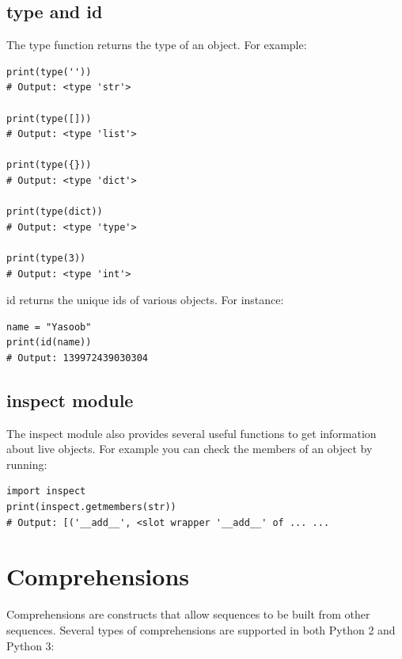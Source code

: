 \documentclass{report}
\begin{document}
    \subsection{type and id}
    \bigbreak \noindent
    The type function returns the type of an object. For example:
    \begin{verbatim}
print(type(''))
# Output: <type 'str'>

print(type([]))
# Output: <type 'list'>

print(type({}))
# Output: <type 'dict'>

print(type(dict))
# Output: <type 'type'>

print(type(3))
# Output: <type 'int'>
    \end{verbatim}
    id returns the unique ids of various objects. For instance:
    \begin{verbatim}
name = "Yasoob"
print(id(name))
# Output: 139972439030304
    \end{verbatim}

    \subsection{inspect module}
    \bigbreak \noindent
    The inspect module also provides several useful functions to get information about live objects. For example you can check the members of an object by running:
    \begin{verbatim}
import inspect
print(inspect.getmembers(str))
# Output: [('__add__', <slot wrapper '__add__' of ... ...
    \end{verbatim}

    \pagebreak \bigbreak \noindent \section{Comprehensions}
    \bigbreak \noindent
    Comprehensions are constructs that allow sequences to be built from other sequences. Several types of comprehensions are supported in both Python 2 and Python 3:
\end{document}
